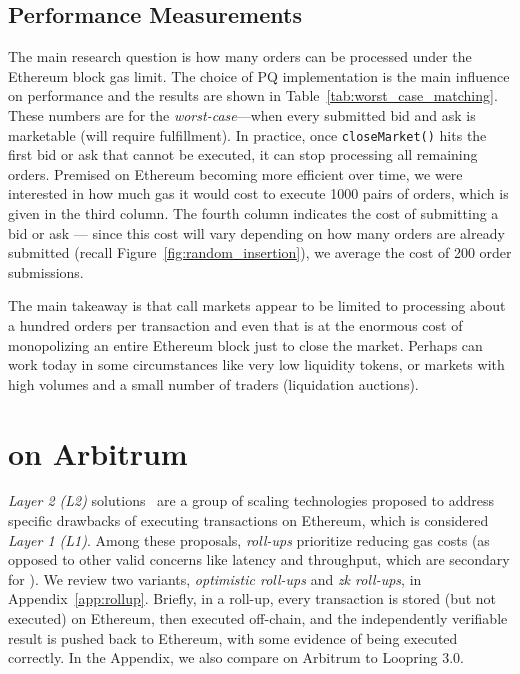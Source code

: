  \subsection{\cm Performance Measurements}

 


The main research question is how many orders can be processed under the Ethereum block gas limit. The choice of PQ implementation is the main influence on performance and the results are shown in Table~\ref{tab:worst_case_matching}. These numbers are for the \textit{worst-case}---when every submitted bid and ask is marketable (\ie will require fulfillment). In practice, once \texttt{closeMarket()} hits the first bid or ask that cannot be executed, it can stop processing all remaining orders. Premised on Ethereum becoming more efficient over time, we were interested in how much gas it would cost to execute 1000 pairs of orders, which is given in the third column. The fourth column indicates the cost of submitting a bid or ask --- since this cost will vary depending on how many orders are already submitted (recall Figure~\ref{fig:random_insertion}), we average the cost of 200 order submissions.

The main takeaway is that call markets appear to be limited to processing about a hundred orders per transaction and even that is at the enormous cost of monopolizing an entire Ethereum block just to close the market. Perhaps \cm can work today in some circumstances like very low liquidity tokens, or markets with high volumes and a small number of traders (\eg liquidation auctions).



\section{\cm on Arbitrum}
\label{sec:rollups}

\textit{Layer 2 (L2)} solutions~\cite{gudgeon2020sok} are a group of scaling technologies proposed to address specific drawbacks of executing transactions on Ethereum, which is considered \textit{Layer 1 (L1)}. Among these proposals, \textit{roll-ups} prioritize reducing gas costs (as opposed to other valid concerns like latency and throughput, which are secondary for \cm). We review two variants, \textit{optimistic roll-ups} and \textit{zk roll-ups}, in Appendix~\ref{app:rollup}. Briefly, in a roll-up, every transaction is stored (but not executed) on Ethereum, then executed off-chain, and the independently verifiable result is pushed back to Ethereum, with some evidence of being executed correctly. In the Appendix, we also compare \cm on Arbitrum to Loopring 3.0.

